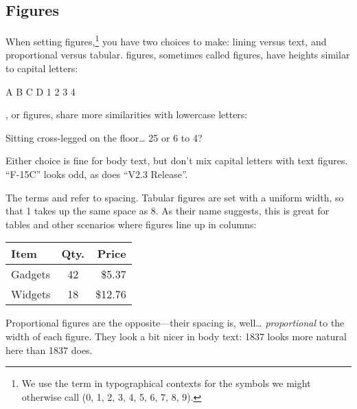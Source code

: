 \subsection{Figures}

When setting figures,\punckern\footnote{%
We use the term  in typographical contexts for the symbols
we might otherwise call  (0, 1, 2, 3, 4, 5, 6, 7, 8, 9).}
you have two
choices to make: lining versus text,
and proportional versus tabular.
 figures, sometimes called  figures,
have heights similar to capital letters:
\begin{leftfigure}
A B C D 1 2 3 4
\end{leftfigure}
, or  figures,
share more similarities with lowercase letters:
\begin{leftfigure}
Sitting cross-legged on the floor\dots{} 25 or 6 to 4?
\end{leftfigure}
Either choice is fine for body text, but don't mix capital letters with
text figures.
``F-15C'' looks odd, as does ``V2.3 Release''\quotekern.

{
The terms  and  refer to spacing.
Tabular figures are set with a uniform width, so that 1 takes up
the same space as 8.
As their name suggests, this is great for tables and other scenarios
where figures line up in columns:}
\begin{leftfigure}
\begin{tabular}{l|c r}
Item & Qty. & Price \\
\hline
Gadgets & 42 & \$5.37 \\
Widgets & 18 & \$12.76 \\
\end{tabular}
\end{leftfigure}
Proportional figures are the opposite---their spacing is, well\dots{}
\emph{proportional} to the width of each figure.
They look a bit nicer in body text: 1837
looks more natural here than
{1837} does.

